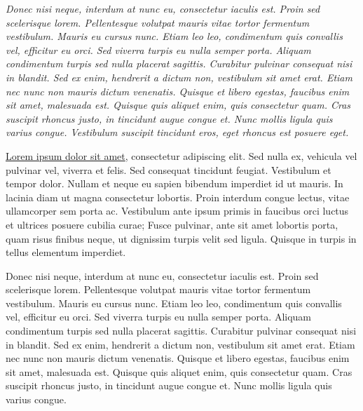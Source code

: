 \documentclass[12pt]{article}
\begin{document}
\vspace{2cm} %


\textit{
Donec nisi neque, interdum at nunc eu, consectetur iaculis est. Proin sed scelerisque lorem. Pellentesque volutpat mauris vitae tortor fermentum vestibulum. Mauris eu cursus nunc. Etiam leo leo, condimentum quis convallis vel, efficitur eu orci. Sed viverra turpis eu nulla semper porta. Aliquam condimentum turpis sed nulla placerat sagittis. Curabitur pulvinar consequat nisi in blandit. Sed ex enim, hendrerit a dictum non, vestibulum sit amet erat. Etiam nec nunc non mauris dictum venenatis. Quisque et libero egestas, faucibus enim sit amet, malesuada est. Quisque quis aliquet enim, quis consectetur quam. Cras suscipit rhoncus justo, in tincidunt augue congue et. Nunc mollis ligula quis varius congue. Vestibulum suscipit tincidunt eros, eget rhoncus est posuere eget.
}

\underline{Lorem ipsum dolor sit amet}, consectetur adipiscing elit. Sed nulla ex, vehicula vel pulvinar vel, viverra et felis. Sed consequat tincidunt feugiat. Vestibulum et tempor dolor. Nullam et neque eu sapien bibendum imperdiet id ut mauris. In lacinia diam ut magna consectetur lobortis. Proin interdum congue lectus, vitae ullamcorper sem porta ac. Vestibulum ante ipsum primis in faucibus orci luctus et ultrices posuere cubilia curae; Fusce pulvinar, ante sit amet lobortis porta, quam risus finibus neque, ut dignissim turpis velit sed ligula. Quisque in turpis in tellus elementum imperdiet.


\hspace{2cm} %
Donec nisi neque, interdum at nunc eu, consectetur iaculis est. Proin sed scelerisque lorem. Pellentesque volutpat mauris vitae tortor fermentum vestibulum. Mauris eu cursus nunc. Etiam leo leo, condimentum quis convallis vel, efficitur eu orci. Sed viverra turpis eu nulla semper porta. Aliquam condimentum turpis sed nulla placerat sagittis. Curabitur pulvinar consequat nisi in blandit. Sed ex enim, hendrerit a dictum non, vestibulum sit amet erat. Etiam nec nunc non mauris dictum venenatis. Quisque et libero egestas, faucibus enim sit amet, malesuada est. Quisque quis aliquet enim, quis consectetur quam. Cras suscipit rhoncus justo, in tincidunt augue congue et. Nunc mollis ligula quis varius congue.
\end{document}

